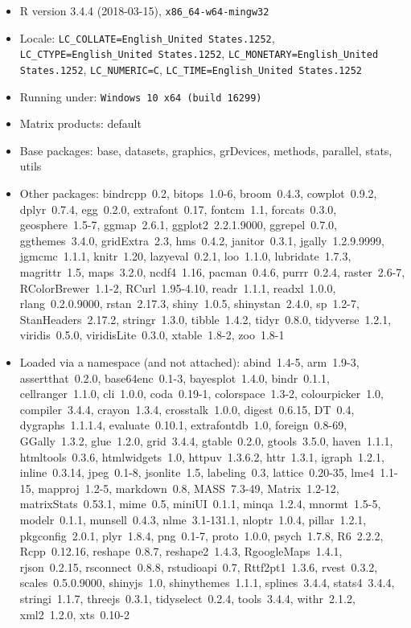 \documentclass[draft]{agujournal}\usepackage{knitr}
\begin{document}
\begin{itemize}\raggedright
  \item R version 3.4.4 (2018-03-15), \verb|x86_64-w64-mingw32|
  \item Locale: \verb|LC_COLLATE=English_United States.1252|, \verb|LC_CTYPE=English_United States.1252|, \verb|LC_MONETARY=English_United States.1252|, \verb|LC_NUMERIC=C|, \verb|LC_TIME=English_United States.1252|
  \item Running under: \verb|Windows 10 x64 (build 16299)|
  \item Matrix products: default
  \item Base packages: base, datasets, graphics, grDevices,
    methods, parallel, stats, utils
  \item Other packages: bindrcpp~0.2, bitops~1.0-6, broom~0.4.3,
    cowplot~0.9.2, dplyr~0.7.4, egg~0.2.0, extrafont~0.17,
    fontcm~1.1, forcats~0.3.0, geosphere~1.5-7, ggmap~2.6.1,
    ggplot2~2.2.1.9000, ggrepel~0.7.0, ggthemes~3.4.0,
    gridExtra~2.3, hms~0.4.2, janitor~0.3.1, jgally~1.2.9.9999,
    jgmcmc~1.1.1, knitr~1.20, lazyeval~0.2.1, loo~1.1.0,
    lubridate~1.7.3, magrittr~1.5, maps~3.2.0, ncdf4~1.16,
    pacman~0.4.6, purrr~0.2.4, raster~2.6-7, RColorBrewer~1.1-2,
    RCurl~1.95-4.10, readr~1.1.1, readxl~1.0.0, rlang~0.2.0.9000,
    rstan~2.17.3, shiny~1.0.5, shinystan~2.4.0, sp~1.2-7,
    StanHeaders~2.17.2, stringr~1.3.0, tibble~1.4.2, tidyr~0.8.0,
    tidyverse~1.2.1, viridis~0.5.0, viridisLite~0.3.0,
    xtable~1.8-2, zoo~1.8-1
  \item Loaded via a namespace (and not attached): abind~1.4-5,
    arm~1.9-3, assertthat~0.2.0, base64enc~0.1-3, bayesplot~1.4.0,
    bindr~0.1.1, cellranger~1.1.0, cli~1.0.0, coda~0.19-1,
    colorspace~1.3-2, colourpicker~1.0, compiler~3.4.4,
    crayon~1.3.4, crosstalk~1.0.0, digest~0.6.15, DT~0.4,
    dygraphs~1.1.1.4, evaluate~0.10.1, extrafontdb~1.0,
    foreign~0.8-69, GGally~1.3.2, glue~1.2.0, grid~3.4.4,
    gtable~0.2.0, gtools~3.5.0, haven~1.1.1, htmltools~0.3.6,
    htmlwidgets~1.0, httpuv~1.3.6.2, httr~1.3.1, igraph~1.2.1,
    inline~0.3.14, jpeg~0.1-8, jsonlite~1.5, labeling~0.3,
    lattice~0.20-35, lme4~1.1-15, mapproj~1.2-5, markdown~0.8,
    MASS~7.3-49, Matrix~1.2-12, matrixStats~0.53.1, mime~0.5,
    miniUI~0.1.1, minqa~1.2.4, mnormt~1.5-5, modelr~0.1.1,
    munsell~0.4.3, nlme~3.1-131.1, nloptr~1.0.4, pillar~1.2.1,
    pkgconfig~2.0.1, plyr~1.8.4, png~0.1-7, proto~1.0.0,
    psych~1.7.8, R6~2.2.2, Rcpp~0.12.16, reshape~0.8.7,
    reshape2~1.4.3, RgoogleMaps~1.4.1, rjson~0.2.15,
    rsconnect~0.8.8, rstudioapi~0.7, Rttf2pt1~1.3.6, rvest~0.3.2,
    scales~0.5.0.9000, shinyjs~1.0, shinythemes~1.1.1,
    splines~3.4.4, stats4~3.4.4, stringi~1.1.7, threejs~0.3.1,
    tidyselect~0.2.4, tools~3.4.4, withr~2.1.2, xml2~1.2.0,
    xts~0.10-2
\end{itemize}
\end{document}
